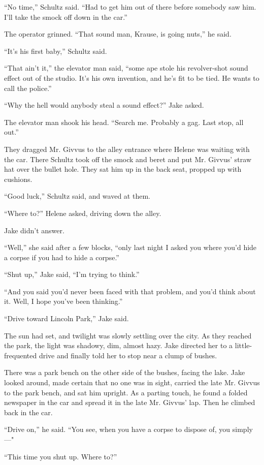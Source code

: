 \documentclass{novel}
\begin{document}
“No time,” Schultz said. “Had to get him out of there before somebody saw him. I’ll take the smock off down in the car.”

The operator grinned. “That sound man, Krause, is going nuts,” he said.

“It’s his first baby,” Schultz said.

“That ain’t it,” the elevator man said, “some ape stole his revolver-shot sound effect out of the studio. It’s his own invention, and he’s fit to be tied. He wants to call the police.”

“Why the hell would anybody steal a sound effect?” Jake asked.

The elevator man shook his head. “Search me. Probably a gag. Last stop, all out.”

They dragged Mr. Givvus to the alley entrance where Helene was waiting with the car. There Schultz took off the smock and beret and put Mr. Givvus’ straw hat over the bullet hole. They sat him up in the back seat, propped up with cushions.

“Good luck,” Schultz said, and waved at them.

“Where to?” Helene asked, driving down the alley.

Jake didn’t answer.

“Well,” she said after a few blocks, “only last night I asked you where you’d hide a corpse if you had to hide a corpse.”

“Shut up,” Jake said, “I’m trying to think.”

“And you said you’d never been faced with that problem, and you’d think about it. Well, I hope you’ve been thinking.”

“Drive toward Lincoln Park,” Jake said.

The sun had set, and twilight was slowly settling over the city. As they reached the park, the light was shadowy, dim, almost hazy. Jake directed her to a little-frequented drive and finally told her to stop near a clump of bushes.

There was a park bench on the other side of the bushes, facing the lake. Jake looked around, made certain that no one was in sight, carried the late Mr. Givvus to the park bench, and sat him upright. As a parting touch, he found a folded newspaper in the car and spread it in the late Mr. Givvus’ lap. Then he climbed back in the car.

“Drive on,” he said. “You see, when you have a corpse to dispose of, you simply—"

“This time you shut up. Where to?”
\end{document}
